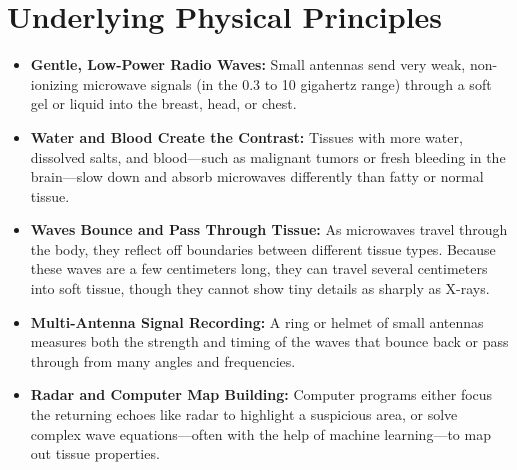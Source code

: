 \section{Underlying Physical Principles}
\begin{itemize}
  \item \textbf{Gentle, Low-Power Radio Waves:} Small antennas send very weak, non-ionizing microwave signals (in the 0.3 to 10 gigahertz range) through a soft gel or liquid into the breast, head, or chest.
  \item \textbf{Water and Blood Create the Contrast:} Tissues with more water, dissolved salts, and blood---such as malignant tumors or fresh bleeding in the brain---slow down and absorb microwaves differently than fatty or normal tissue.
  \item \textbf{Waves Bounce and Pass Through Tissue:} As microwaves travel through the body, they reflect off boundaries between different tissue types. Because these waves are a few centimeters long, they can travel several centimeters into soft tissue, though they cannot show tiny details as sharply as X-rays.
  \item \textbf{Multi-Antenna Signal Recording:} A ring or helmet of small antennas measures both the strength and timing of the waves that bounce back or pass through from many angles and frequencies.
  \item \textbf{Radar and Computer Map Building:} Computer programs either focus the returning echoes like radar to highlight a suspicious area, or solve complex wave equations---often with the help of machine learning---to map out tissue properties.
\end{itemize}

